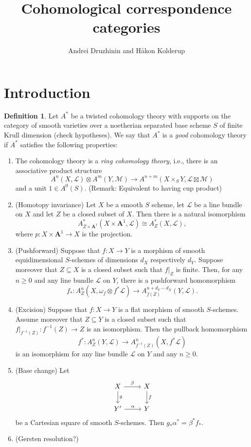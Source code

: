\documentclass[a4paper, oneside, english,reqno]{amsart}
\theoremstyle{plain}
\theoremstyle{definition}
\newtheorem{definition}[theorem]{Definition}
\theoremstyle{remark}
\newcommand{\A}{\mathbf{A}}
\newcommand{\scrL}{\mathscr{L}}
\newcommand{\scrM}{\mathscr{M}}
\begin{document}
\title{Cohomological correspondence categories}
\author{Andrei Druzhinin and Håkon Kolderup}
\maketitle

\section{Introduction}

\begin{definition}\label{def:coh}
Let $A^*$ be a twisted cohomology theory with supports on the category of smooth varieties over a noetherian separated base scheme $S$ of finite Krull dimension (check hypotheses). We say that $A^*$ is a \emph{good} cohomology theory if $A^*$ satisfies the following properties:
\begin{enumerate}
\item The cohomology theory is a \emph{ring cohomology theory}, i.e., there is an associative product structure
\[
A^n(X,\scrL)\otimes A^m(Y,\scrM)\to A^{n+m}(X\times_S Y,\scrL\boxtimes \scrM)
\]
and a unit $1\in A^0(S)$. (Remark: Equivalent to having cup product)
\item (Homotopy invariance) Let $X$ be a smooth $S$ scheme, let $\scrL$ be a line bundle on $X$ and let $Z$ be a closed subset of $X$. Then there is a natural isomorphism
\[
A^*_{Z\times\A^1}(X\times\A^1,\scrL)\cong A^*_Z(X,\scrL),
\]
where $p\colon X\times\A^1\to X$ is the projection.
\item (Pushforward) Suppose that $f\colon X\to Y$ is a morphism of smooth equidimensional $S$-schemes of dimensions $d_X$ respectively $d_Y$. Suppose moreover that $Z\subseteq X$ is a closed subset such that $f|_Z$ is finite. Then, for any $n\ge0$ and any line bundle $\scrL$ on $Y$, there is a pushforward homomorphism
\[
f_*\colon A^n_Z(X,\omega_f\otimes f^*\scrL)\to A^{n+d_Y-d_X}_{f(Z)}(Y,\scrL).
\]
\item (Excision) Suppose that $f\colon X\to Y$ is a flat morphism of smooth $S$-schemes. Assume moreover that $Z\subseteq Y$ is a closed subset such that $f|_{f^{-1}(Z)}\colon f^{-1}(Z)\to Z$ is an isomorphism. Then the pullback homomorphism
\[
f^*\colon A^n_Z(Y,\scrL)\to A^n_{f^{-1}(Z)}(X,f^*\scrL)
\]
is an isomorphism for any line bundle $\scrL$ on $Y$ and any $n\ge0$.
\item (Base change) Let
\[\begin{tikzcd}
X\ar{r}{\beta}\ar{d}{g} & X\ar{d}{f} \\
Y'\ar{r}{\alpha} & Y
\end{tikzcd}\]
be a Cartesian square of smooth $S$-schemes. Then $g_*\alpha^*=\beta^*f_*$.
\item (Gersten resolution?)

\end{enumerate}
\end{definition}
\end{document}
